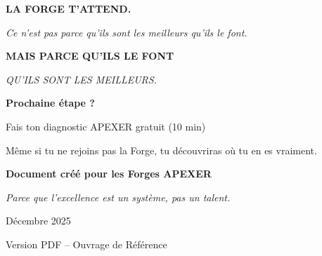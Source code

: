 \documentclass[12pt,a4paper,openany]{book}
\begin{document}
\vspace{1.5cm}

\begin{center}
\LARGE\textbf{\color{apexred} LA FORGE T'ATTEND.}

\vspace{1cm}

\Large\textit{Ce n'est pas parce qu'ils sont les meilleurs qu'ils le font.}

\vspace{0.3cm}

\Large\textbf{\color{apexred}MAIS PARCE QU'ILS LE FONT}

\vspace{0.3cm}

\Large\textit{QU'ILS SONT LES MEILLEURS.}
\end{center}

\vspace{2cm}

\begin{tcolorbox}[colback=apexred!10, colframe=apexred, boxrule=2pt]
\textbf{Prochaine étape ?}

Fais ton diagnostic APEXER gratuit (10 min)

Même si tu ne rejoins pas la Forge, tu découvriras où tu en es vraiment.
\end{tcolorbox}

\clearpage

\vspace*{3cm}

\begin{center}
\Large\textbf{Document créé pour les Forges APEXER}

\vspace{0.5cm}

\textit{Parce que l'excellence est un système, pas un talent.}

\vspace{1cm}

Décembre 2025

\vspace{1cm}

{\small Version PDF -- Ouvrage de Référence}
\end{center}
\end{document}
